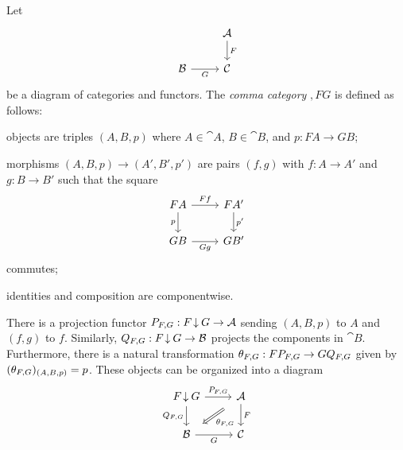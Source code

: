 \begin{defn} \label{def:comma-category}
Let
\[\begin{tikzcd}
	& {\cat{A}} \\
	{\cat{B}} & {\cat{C}}
	\arrow["G"', from=2-1, to=2-2]
	\arrow["F", from=1-2, to=2-2]
\end{tikzcd}\]
be a diagram of categories and functors. The \emph{comma category} $\comma{F}{G}$ is defined as follows:
\begin{items}
    \item objects are triples $(A, B, p)$ where $A \in \cat{A}$, $B \in \cat{B}$, and $p : FA \to GB$;
    \item morphisms $(A, B, p) \to (A', B', p')$ are pairs $(f, g)$ with $f : A \to A'$ and $g : B \to B'$ such that the square
    \[\begin{tikzcd}
    	FA & {FA'} \\
    	GB & {GB'}
    	\arrow["Ff", from=1-1, to=1-2]
    	\arrow["Gg"', from=2-1, to=2-2]
    	\arrow["p"', from=1-1, to=2-1]
    	\arrow["{p'}", from=1-2, to=2-2]
    \end{tikzcd}\]
    commutes;
    \item identities and composition are componentwise.
\end{items}
\end{defn}

There is a projection functor $P_{F, G} : F \mathbin{\hspace{-1pt}\downarrow} G \to \mathcal{A}$ sending $(A, B, p)$ to $A$ and $(f, g)$ to $f$. Similarly, $Q_{F, G} : F \mathbin{\hspace{-1pt}\downarrow} G \to \mathcal{B}$ projects the components in $\cat{B}$. Furthermore, there is a natural transformation $\theta_{F, G} : FP_{F, G} \to GQ_{F, G}$ given by $(\theta_{F, G})_{(A, B, p)} = p$. These objects can be organized into a diagram
\[\begin{tikzcd}
	{\comma{F}{G}} & {\cat{A}} \\
	{\cat{B}} & {\cat{C}}
	\arrow["G"', from=2-1, to=2-2]
	\arrow["F", from=1-2, to=2-2]
	\arrow["{\commasnd{F}{G}}"', from=1-1, to=2-1]
	\arrow["{\commafst{F}{G}}", from=1-1, to=1-2]
	\arrow["{\commatrd{F}{G}}", shorten <=8pt, shorten >=8pt, Rightarrow, from=1-2, to=2-1]
\end{tikzcd}\]

